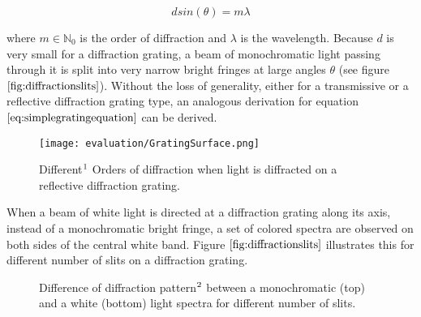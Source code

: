 \begin{equation}
 d sin(\theta) = m \lambda 
\label{eq:simplegratingequation}
\end{equation}

where $m \in \mathds{N}_0$ is the order of diffraction and $\lambda$ is the wavelength. Because $d$ is very small for a diffraction grating, a beam of monochromatic light passing through it is split into very narrow bright fringes at large angles $\theta$ (see figure $\ref{fig:diffractionslits}$). Without the loss of generality, either for a transmissive or a reflective diffraction grating type, an analogous derivation for equation $\ref{eq:simplegratingequation}$ can be derived.

\begin{figure}[H]
  \centering
  \texttt{[image: evaluation/GratingSurface.png]}
  \caption[Diffraction Orders]{Different$\footnotemark$ Orders of diffraction when light is diffracted on a reflective diffraction grating.}
\label{fig:gratingdiffractionorders}
\end{figure}

When a beam of white light is directed at a diffraction grating along its axis, instead of a monochromatic bright fringe, a set of colored spectra are observed on both sides of the central white band. Figure $\ref{fig:diffractionslits}$ illustrates this for different number of slits on a diffraction grating. 

\begin{figure}[H]
  \centering
  
\caption[N Slit Diffraction Grating Pattern]{Difference of diffraction pattern$\footnotemark$ between a monochromatic (top) and a white (bottom) light spectra for different number of slits.}
\label{fig:diffractionslits}
\end{figure}

